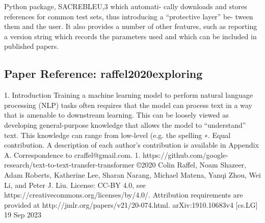 Python package, SACREBLEU,3 which automati- cally downloads and stores references for common test sets, thus introducing a “protective layer” be- tween them and the user. It also provides a number of other features, such as reporting a version string which records the parameters used and which can be included in published papers.

\vspace{18pt}


\subsection*{Paper Reference: raffel2020exploring}

1. Introduction Training a machine learning model to perform natural language processing (NLP) tasks often requires that the model can process text in a way that is amenable to downstream learning. This can be loosely viewed as developing general-purpose knowledge that allows the model to “understand” text. This knowledge can range from low-level (e.g. the spelling ∗. Equal contribution. A description of each author’s contribution is available in Appendix A. Correspondence to craffel@gmail.com. 1. https://github.com/google-research/text-to-text-transfer-transformer ©2020 Colin Raffel, Noam Shazeer, Adam Roberts, Katherine Lee, Sharan Narang, Michael Matena, Yanqi Zhou, Wei Li, and Peter J. Liu. License: CC-BY 4.0, see https://creativecommons.org/licenses/by/4.0/. Attribution requirements are provided at http://jmlr.org/papers/v21/20-074.html. arXiv:1910.10683v4 [cs.LG] 19 Sep 2023

